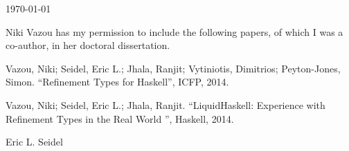 \documentclass{article}
\begin{document}
\today

Niki Vazou has my permission to include the following papers, of which
I was a co-author, in her doctoral dissertation.

Vazou, Niki; Seidel, Eric L.; Jhala, Ranjit; Vytiniotis, Dimitrios; Peyton-Jones, Simon.
``Refinement Types for Haskell'', ICFP, 2014.

Vazou, Niki; Seidel, Eric L.; Jhala, Ranjit.
``LiquidHaskell: Experience with Refinement Types in the Real World '', Haskell, 2014.

\baselineskip
Eric L. Seidel
\end{document}
